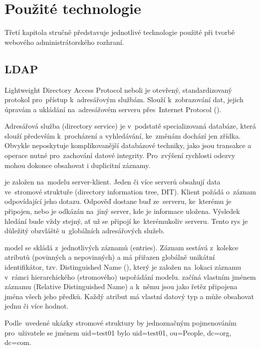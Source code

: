 \chapter{Použité technologie}
\label{3-technologie}

Třetí kapitola stručně představuje jednotlivé technologie použité při
tvorbě webového administrátorského rozhraní.

\section{LDAP}
Lightweight Directory Access Protocol neboli  je otevřený,
standardizovaný protokol pro~přístup k~adresářovým službám. Slouží k~zobrazování 
dat, jejich úpravám a ukládání na~adresářovém serveru přes~Internet 
Protocol (). \cite{ldap}

Adresářová služba (directory service) je v~podstatě specializovaná
databáze, která slouží především k~procházení a vyhledávání, ke~změnám
dochází jen zřídka. Obvykle neposkytuje komplikovanější databázové
techniky, jako jsou transakce a operace nutné pro~zachování datové
integrity. Pro~zvýšení rychlosti odezvy mohou dokonce obsahovat i
duplicitní záznamy.

 je založen na~modelu server-klient. Jeden či více 
serverů obsahují data ve~stromové struktuře (directory information
tree, DIT). Klient požádá o~záznam odpovídající jeho dotazu. Odpověď
dostane buď ze~serveru, ke~kterému je připojen, nebo je odkázán na~jiný 
server, kde je informace uložena. Výsledek hledání bude vždy
stejný, ať už se připojí ke~kterémukoliv serveru. Tento rys je
důležitý obzvláště u~globálních adresářových služeb. \cite{openldap}

 model se skládá z~jednotlivých záznamů (entries). Záznam
sestává z~kolekce atributů (povinných a nepovinných) a má přiřazen
globálně unikátní identifikátor, tzv. Distinguished Name (),
který je založen na~lokaci záznamu v~rámci hierarchického (stromového)
uspořádání modelu.  začíná vlastním jménem záznamu (Relative
Distinguished Name) a k~němu jsou jako řetěz připojena jména všech
jeho předků. Každý atribut má vlastní datový typ a může obsahovat
jednu či více hodnot. \cite{ldap}

Podle~uvedené ukázky stromové struktury by jednoznačným pojmenováním
pro~uživatele se jménem \textsf{uid=test01} bylo 
\textsf{uid=test01, ou=People, dc=org, dc=com}.


